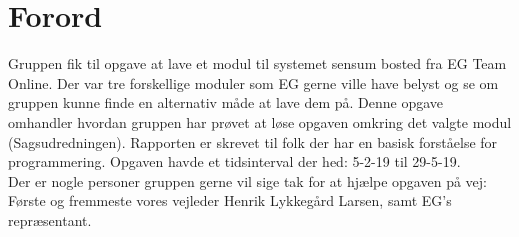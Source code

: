 \chapter{Forord}
Gruppen fik til opgave at lave et modul til systemet sensum bosted fra EG Team Online. Der var tre forskellige moduler som EG gerne ville have belyst og se om gruppen kunne finde en alternativ måde at lave dem på. Denne opgave omhandler hvordan gruppen har prøvet at løse opgaven omkring det valgte modul (Sagsudredningen). Rapporten er skrevet til folk der har en basisk forståelse for programmering. Opgaven havde et tidsinterval der hed: 5-2-19 til 29-5-19. \\
Der er nogle personer gruppen gerne vil sige tak for at hjælpe opgaven på vej:\\
Første og fremmeste vores vejleder Henrik Lykkegård Larsen, samt EG’s repræsentant.  
\\ 
